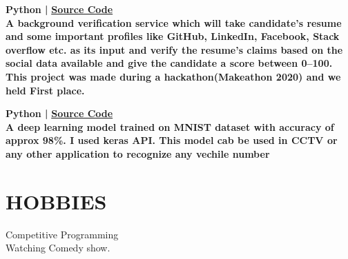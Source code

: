 \documentclass[]{deedy-resume-openfont}
\begin{document}
\begin{minipage}[t]{0.66\textwidth}
\textbf{Python | } \textbf{\href{https://github.com/divakar-lakhera/Makeathon2020}{Source Code}} \\  
\textbf{A background verification service which will take candidate’s resume and some important profiles like GitHub, LinkedIn, Facebook, Stack overflow etc. as its input and
verify the resume’s claims based on the social data available and give the candidate a
score between 0–100.
This project was made during a hackathon(Makeathon 2020) and we held First place.}
\sectionsep

\textbf{Python | } \textbf{\href{https://github.com/Pankajcoder1/machine_learning_and_more../tree/master/mnist}{Source Code}} \\ 
\textbf{A deep learning model trained on MNIST dataset with accuracy of approx 98\%. I used keras API. This model cab be used in CCTV or any other application to recognize any vechile number}
\sectionsep



\section{HOBBIES}
\textbullet{} Competitive Programming \\
\textbullet{} Watching Comedy show. \\



% 
% 

\end{minipage} 
\end{document}
